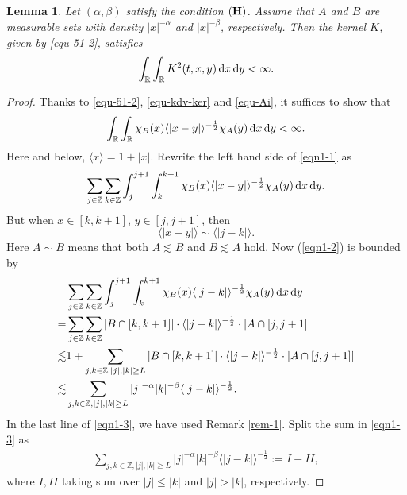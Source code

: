 \documentclass[12pt]{amsart}
\def\d{{\,\rm d}}
\newtheorem{lemma}[proposition]{Lemma}
\theoremstyle{definition}
\numberwithin{equation}{section}
\begin{document}
\begin{lemma}\label{lem-comp-2}
Let $(\alpha,\beta)$ satisfy the condition $({\bf H})$. Assume that  $A$ and $B$ are measurable sets with density $|x|^{-\alpha}$ and $|x|^{-\beta}$, respectively. Then the kernel $K$, given by \eqref{equ-51-2}, satisfies
    $$
       \int_{\mathbb{R}}\int_{\mathbb{R}}K^2(t,x,y)\d x\d y<\infty.
    $$
 \end{lemma}

 \begin{proof}
Thanks to \eqref{equ-51-2}, \eqref{equ-kdv-ker} and \eqref{equ-Ai}, it suffices to show that
    \begin{equation}
       \int_{\mathbb{R}}\int_{\mathbb{R}}\chi_B(x)\langle|x-y|\rangle^{-\frac{1}{2}}\chi_A(y)\d x\d y<\infty.\label{eqn1-1}
    \end{equation}
Here and below, $\langle x \rangle = 1+|x|$.
    Rewrite the left hand side of \eqref{eqn1-1}  as
    \begin{equation}
       \sum_{j\in \mathbb{Z}}\sum_{k\in\mathbb{Z}}\int_j^{j+1}\int_k^{k+1}\chi_B(x)\langle|x-y|\rangle^{-\frac{1}{2}}\chi_A(y)\d x\d y.\label{eqn1-2}
    \end{equation}
    But when $x\in [k,k+1]$, $y\in[j,j+1]$, then
    $$
       \langle|x-y|\rangle\sim \langle|j-k|\rangle.
    $$
Here $A\sim B$ means that both $A\lesssim B$ and $B\lesssim A$ hold.
    Now (\ref{eqn1-2}) is bounded by
    \begin{align}
       &\sum_{j\in \mathbb{Z}}\sum_{k\in\mathbb{Z}}\int_j^{j+1}\int_k^{k+1}\chi_B(x)\langle|j-k|\rangle^{-\frac{1}{2}}\chi_A(y)\d x\d y\notag\\
       =&\sum_{j\in\mathbb{Z}}\sum_{k\in\mathbb{Z}}|B\cap [k,k+1]|\cdot \langle|j-k|\rangle^{-\frac{1}{2}}\cdot |A\cap [j,j+1]|\notag\\
       \lesssim & 1+\sum_{j,k\in\mathbb{Z},|j|,|k|\ge L} |B\cap[k,k+1]|\cdot \langle|j-k|\rangle^{-\frac{1}{2}}\cdot|A\cap [j,j+1]|\notag\\
       \lesssim & \sum_{j,k\in\mathbb{Z},|j|,|k|\ge L} |j|^{-\alpha}|k|^{-\beta}\langle |j-k|\rangle^{-\frac{1}{2}}.\label{eqn1-3}
    \end{align}
In the last line of \eqref{eqn1-3}, we have used Remark \ref{rem-1}.
 Split the sum in \eqref{eqn1-3} as
 \begin{align}\label{equ-426-10}
 \sum_{j,k\in\mathbb{Z},|j|,|k|\ge L} |j|^{-\alpha}|k|^{-\beta}\langle |j-k|\rangle^{-\frac{1}{2}}:= I+II,
 \end{align}
 where $I, II$ taking sum over  $|j|\leq |k|$ and $|j|>|k|$, respectively.


\end{proof}
\end{document}
